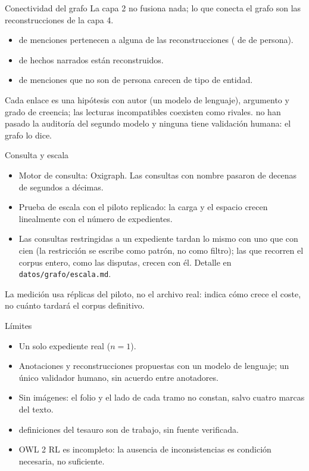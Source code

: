 \documentclass[aspectratio=169,11pt]{beamer}
\newcommand{\ttt}[1]{\texttt{\small #1}}
\newcommand{\cifra}[1]{\textbf{\alert{#1}}}
\begin{document}
\begin{frame}{Conectividad del grafo}
La capa 2 no fusiona nada; lo que conecta el grafo son las reconstrucciones de la capa 4.
\begin{itemize}
\item \cifra{\cifraMencionesEnlazadas} de \cifra{\cifraMenciones} menciones pertenecen a alguna de las
      \cifra{\cifraReconstrucciones} reconstrucciones (\cifra{\cifraPersonasEnlazadas} de \cifra{\cifraPersonas} de persona).
\item \cifra{\cifraHechosEnlazados} de \cifra{\cifraHechosNarrados} hechos narrados están reconstruidos.
\item \cifra{\cifraEntidadesSinTipo} de \cifra{\cifraEntidadesNoPersona} menciones que no son de persona carecen de tipo de entidad.
\end{itemize}
\medskip
Cada enlace es una \alert{hipótesis} con autor (un modelo de lenguaje), argumento y grado de creencia; las lecturas
incompatibles coexisten como rivales. \cifra{\cifraReconstruccionesSinAuditar} no han pasado la auditoría del segundo
modelo y ninguna tiene validación humana: el grafo lo dice.
\end{frame}

\begin{frame}{Consulta y escala}
\begin{itemize}
\item Motor de consulta: Oxigraph. Las consultas con nombre pasaron de decenas de segundos a décimas.
\item Prueba de escala con el piloto replicado: la carga y el espacio crecen linealmente con el número de expedientes.
\item Las consultas restringidas a un expediente tardan lo mismo con uno que con cien (la restricción se escribe
      como patrón, no como filtro); las que recorren el corpus entero, como las disputas, crecen con él.
      Detalle en \ttt{datos/grafo/escala.md}.
\end{itemize}
\medskip
\footnotesize La medición usa réplicas del piloto, no el archivo real: indica cómo crece el coste, no cuánto tardará
el corpus definitivo.
\end{frame}

\begin{frame}{Límites}
\begin{itemize}
\item Un solo expediente real ($n=1$).
\item Anotaciones y reconstrucciones propuestas con un modelo de lenguaje; un único validador humano, sin acuerdo
      entre anotadores.
\item Sin imágenes: el folio y el lado de cada tramo no constan, salvo cuatro marcas del texto.
\item \cifra{\cifraDefinicionesDeTrabajo} definiciones del tesauro son de trabajo, sin fuente verificada.
\item OWL 2 RL es incompleto: la ausencia de inconsistencias es condición necesaria, no suficiente.
\end{itemize}
\end{frame}
\end{document}
